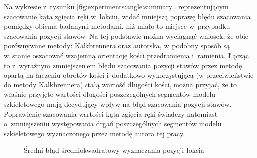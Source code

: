 Na wykresie z~rysunku \ref{fig:experiments:angle:summary}, reprezentującym szacowanie kąta zgięcia ręki w~łokciu, widać mniejszą poprawę błędu szacowania pomiędzy obiema badanymi metodami, niż miało to miejsce w~przypadku szacowania pozycji stawów. Na tej podstawie można wyciągnąć wniosek, że obie porównywane metody: Kalkbrennera oraz autorska, w~podobny sposób są w~stanie oszacować wzajemną orientację kości przedramienia i~ramienia. Łącząc to z~wyraźnym zmniejszeniem błędu szacowania pozycji stawów przez metodę opartą na łączeniu obrotów kości i~dodatkowo wykorzystującą (w przeciwieństwie do metody Kalkbrennera) stałą wartość długości kości, można przyjać, że to właśnie przyjęte wartości długości poszczególnych segmentów modelu szkieletowego mają decydujący wpływ na błąd szacowania pozycji stawów. Poprawienie szacowania wartości kąta zgięcia ręki świadczy natomiast o~zmniejszeniu występowania drgań poszczególnych segmentów modelu szkieletowego wyznaczonego przez metodę autora tej pracy.

\begin{figure}[!htb]
	\centering
	\caption{Średni błąd średniokwadratowy wyznaczania pozycji łokcia}
	\label{fig:experiments:elbow:summary}
\end{figure}

